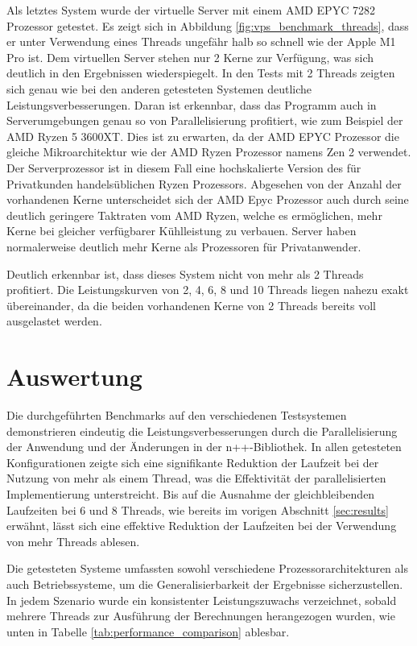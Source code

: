 Als letztes System wurde der virtuelle Server mit einem AMD EPYC 7282 Prozessor getestet. Es zeigt sich in Abbildung \ref{fig:vps_benchmark_threads}, dass er unter Verwendung eines Threads ungefähr halb so schnell wie der Apple M1 Pro ist. Dem virtuellen Server stehen nur 2 Kerne zur Verfügung, was sich deutlich in den Ergebnissen wiederspiegelt. In den Tests mit 2 Threads zeigten sich genau wie bei den anderen getesteten Systemen deutliche Leistungsverbesserungen. Daran ist erkennbar, dass das Programm auch in Serverumgebungen genau so von Parallelisierung profitiert, wie zum Beispiel der AMD Ryzen 5 3600XT. Dies ist zu erwarten, da der AMD EPYC Prozessor die gleiche Mikroarchitektur wie der AMD Ryzen Prozessor namens Zen 2 \citep{Epyc_Specifications} verwendet. Der Serverprozessor ist in diesem Fall eine hochskalierte Version des für Privatkunden handelsüblichen Ryzen Prozessors. Abgesehen von der Anzahl der vorhandenen Kerne unterscheidet sich der AMD Epyc Prozessor auch durch seine deutlich geringere Taktraten vom AMD Ryzen, welche es ermöglichen, mehr Kerne bei gleicher verfügbarer Kühlleistung zu verbauen. Server haben normalerweise deutlich mehr Kerne als Prozessoren für Privatanwender.

Deutlich erkennbar ist, dass dieses System nicht von mehr als 2 Threads profitiert. Die Leistungskurven von 2, 4, 6, 8 und 10 Threads liegen nahezu exakt übereinander, da die beiden vorhandenen Kerne von 2 Threads bereits voll ausgelastet werden.

\section{Auswertung}

Die durchgeführten Benchmarks auf den verschiedenen Testsystemen demonstrieren eindeutig die Leistungsverbesserungen durch die Parallelisierung der Anwendung und der Änderungen in der n++-Bibliothek. In allen getesteten Konfigurationen zeigte sich eine signifikante Reduktion der Laufzeit bei der Nutzung von mehr als einem Thread, was die Effektivität der parallelisierten Implementierung unterstreicht. Bis auf die Ausnahme der gleichbleibenden Laufzeiten bei 6 und 8 Threads, wie bereits im vorigen Abschnitt \ref{sec:results} erwähnt, lässt sich eine effektive Reduktion der Laufzeiten bei der Verwendung von mehr Threads ablesen.

Die getesteten Systeme umfassten sowohl verschiedene Prozessorarchitekturen als auch Betriebssysteme, um die Generalisierbarkeit der Ergebnisse sicherzustellen. In jedem Szenario wurde ein konsistenter Leistungszuwachs verzeichnet, sobald mehrere Threads zur Ausführung der Berechnungen herangezogen wurden, wie unten in Tabelle \ref{tab:performance_comparison} ablesbar.

